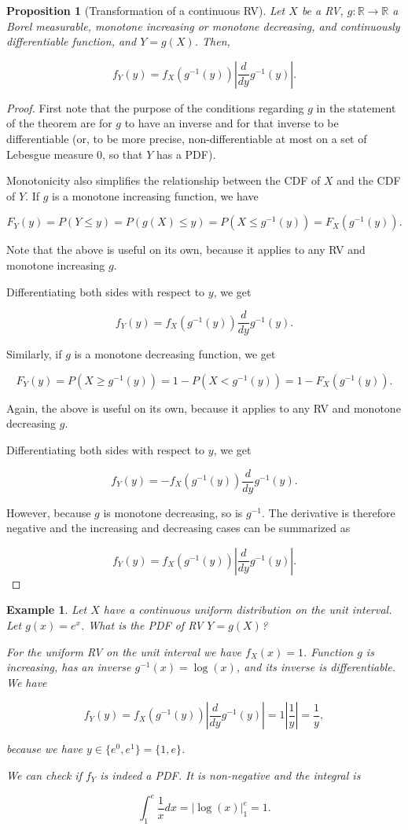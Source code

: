 \documentclass{book}
\theoremstyle{plain}%
\newtheorem{prototheorem}{Example}[section]
\newenvironment{cexample}
   {\colorlet{shadecolor}{gray!10}\begin{shaded}\begin{prototheorem}}
   {\end{prototheorem}\end{shaded}}
\newtheorem{proposition}{Proposition}[section]
\theoremstyle{definition}
\newlength{\arrow}
\begin{document}
\begin{proposition}[Transformation of a continuous RV]
Let $X$ be a RV, $g: \mathbb{R} \rightarrow \mathbb{R}$ a Borel measurable, monotone increasing or monotone decreasing, and continuously differentiable function, and $Y = g(X)$. Then,

$$f_Y(y) = f_X(g^{-1}(y)) |\frac{d}{dy}g^{-1}(y)|.$$
\end{proposition}

\begin{proof} First note that the purpose of the conditions regarding $g$ in the statement of the theorem are for $g$ to have an inverse and for that inverse to be differentiable (or, to be more precise, non-differentiable at most on a set of Lebesgue measure 0, so that $Y$ has a PDF).

Monotonicity also simplifies the relationship between the CDF of $X$ and the CDF of $Y$. If $g$ is a monotone increasing function, we have 

$$F_Y(y) = P(Y \leq y) = P(g(X) \leq y) = P(X \leq g^{-1}(y)) = F_X(g^{-1}(y)).$$

Note that the above is useful on its own, because it applies to any RV and monotone increasing $g$.

Differentiating both sides with respect to $y$, we get

$$f_Y(y) = f_X(g^{-1}(y)) \frac{d}{dy}g^{-1}(y).$$

Similarly, if $g$ is a monotone decreasing function, we get 

$$F_Y(y) = P(X \geq g^{-1}(y)) = 1 - P(X < g^{-1}(y)) = 1 - F_X(g^{-1}(y)).$$

Again, the above is useful on its own, because it applies to any RV and monotone decreasing $g$.

Differentiating both sides with respect to $y$, we get

$$f_Y(y) = - f_X(g^{-1}(y)) \frac{d}{dy}g^{-1}(y).$$

However, because $g$ is monotone decreasing, so is $g^{-1}$. The derivative is therefore negative and the increasing and decreasing cases can be summarized as


$$f_Y(y) = f_X(g^{-1}(y)) |\frac{d}{dy}g^{-1}(y)|.$$
\end{proof}

\begin{cexample}
Let $X$ have a continuous uniform distribution on the unit interval. Let $g(x) = e^x$. What is the PDF of RV $Y = g(X)$?

For the uniform RV on the unit interval we have $f_X(x) = 1$. Function $g$ is increasing, has an inverse $g^{-1}(x) = \log(x)$, and its inverse is differentiable. We have

$$f_Y(y) = f_X(g^{-1}(y)) |\frac{d}{dy}g^{-1}(y)| = 1 |\frac{1}{y}| = \frac{1}{y},$$

because we have $y \in \{e^0, e^1\} = \{1, e\}$.

We can check if $f_Y$ is indeed a PDF. It is non-negative and the integral is

$$\int_1^e \frac{1}{x} dx = |\log(x)|_{1}^e = 1.$$


\end{cexample}
\end{document}
